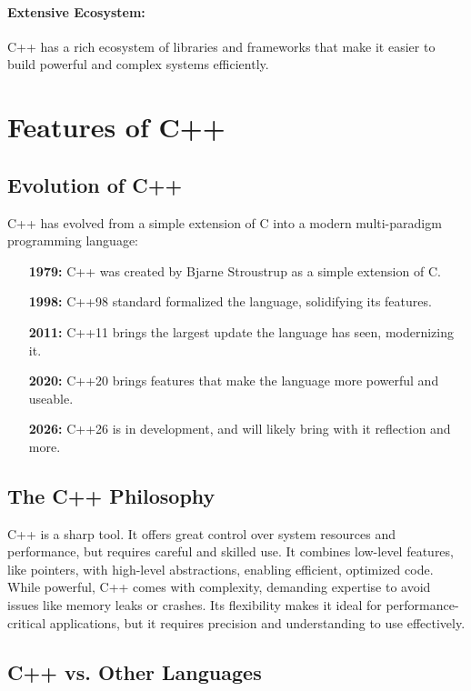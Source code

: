 \documentclass{article}
\begin{document}
\paragraph{Extensive Ecosystem:}
C++ has a rich ecosystem of libraries and frameworks that make it easier to build powerful and complex systems efficiently.

\section{Features of C++}

\subsection{Evolution of C++}

\noindent
C++ has evolved from a simple extension of C into a modern multi-paradigm programming language:

\begin{itemize}
	\item[\textbf{1979:}] C++ was created by Bjarne Stroustrup as a simple extension of C.
	\item[\textbf{1998:}] C++98 standard formalized the language, solidifying its features.
	\item[\textbf{2011:}] C++11 brings the largest update the language has seen, modernizing it.
	\item[\textbf{2020:}] C++20 brings features that make the language more powerful and useable.
	\item[\textbf{2026:}] C++26 is in development, and will likely bring with it reflection and more.
\end{itemize}

\subsection{The C++ Philosophy}

\noindent
C++ is a sharp tool. It offers great control over system resources and performance, but requires careful and skilled use. It combines low-level features, like pointers, with high-level abstractions, enabling efficient, optimized code. While powerful, C++ comes with complexity, demanding expertise to avoid issues like memory leaks or crashes. Its flexibility makes it ideal for performance-critical applications, but it requires precision and understanding to use effectively.

\subsection{C++ vs. Other Languages}
\end{document}
